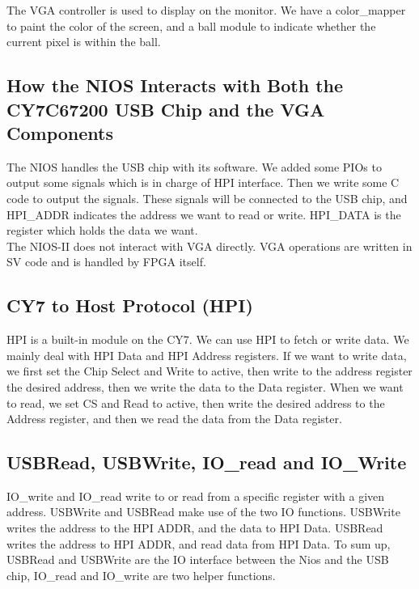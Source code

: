 \documentclass[12pt]{article}
\begin{document}
The VGA controller is used to display on the monitor. We have a color\_mapper to paint the color of the screen, and a ball module to indicate whether the current pixel is within the ball. 

\subsection{How the NIOS Interacts with Both the CY7C67200 USB Chip and the VGA Components}
The NIOS handles the USB chip with its software. We added some PIOs to output some signals which is in charge of HPI interface. Then we write some C code to output the signals. These signals will be connected to the USB chip, and HPI\_ADDR indicates the address we want to read or write. HPI\_DATA is the register which holds the data we want. \\

The NIOS-II does not interact with VGA directly. VGA operations are written in SV code and is handled by FPGA itself. 

\subsection{CY7 to Host Protocol (HPI)}
HPI is a built-in module on the CY7. We can use HPI to fetch or write data. We mainly deal with HPI Data and HPI Address registers. If we want to write data, we first set the Chip Select and Write to active, then write to the address register the desired address, then we write the data to the Data register. When we want to read, we set CS and Read to active, then write the desired address to the Address register, and then we read the data from the Data register. 

\subsection{USBRead, USBWrite, IO\_read and IO\_Write}
IO\_write and IO\_read write to or read from a specific register with a given address. USBWrite and USBRead make use of the two IO functions. USBWrite writes the address to the HPI ADDR, and the data to HPI Data. USBRead writes the address to HPI ADDR, and read data from HPI Data. To sum up, USBRead and USBWrite are the IO interface between the Nios and the USB chip, IO\_read and IO\_write are two helper functions. 
\end{document}
